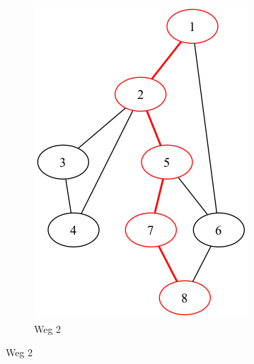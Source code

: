 \documentclass[a4paper,11pt]{report}
\begin{document}
\begin{figure}[htbp]
\begin{subfigure}[b]{0.45\textwidth}
        \includegraphics[height=0.2\textheight]{notebook/assets/aufgabe_03_graph_path_1_to_8_2.png}
        \caption{Weg 2}
        \label{fig:way_2}
    \end{subfigure}
    \hfill

    \vspace{1em}


\end{figure}
\end{document}
